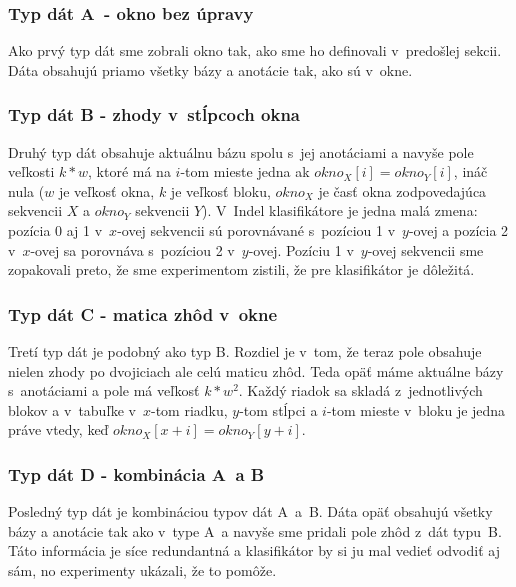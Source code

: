 \subsubsection{Typ dát A~- okno bez úpravy}

Ako prvý typ dát sme zobrali okno tak, ako sme ho definovali v~predošlej sekcii. Dáta obsahujú priamo všetky bázy a anotácie tak, ako sú v~okne.

\subsubsection{Typ dát B - zhody v~stĺpcoch okna}

Druhý typ dát obsahuje aktuálnu bázu spolu s~jej anotáciami a navyše pole veľkosti $k*w$,
ktoré má na $i$-tom mieste jedna ak $okno_X[i] = okno_Y[i]$, ináč nula
($w$ je veľkosť okna, $k$ je veľkosť bloku, $okno_X$ je časť okna zodpovedajúca sekvencii $X$ a $okno_Y$ sekvencii $Y$).
V~Indel klasifikátore je jedna malá zmena: pozícia 0 aj 1 v~$x$-ovej sekvencii sú porovnávané s~pozíciou 1 v~$y$-ovej a pozícia 2 v~$x$-ovej sa porovnáva s~pozíciou 2 v~$y$-ovej.
Pozíciu 1 v~$y$-ovej sekvencii sme zopakovali preto, že sme experimentom zistili, že pre klasifikátor je dôležitá.

\subsubsection{Typ dát C - matica zhôd v~okne}

Tretí typ dát je podobný ako typ B. Rozdiel je v~tom, že teraz pole obsahuje nielen zhody po dvojiciach ale celú maticu zhôd. Teda opäť máme aktuálne bázy s~anotáciami a pole má veľkosť $k*w^2$. Každý riadok sa skladá z~jednotlivých blokov a v~tabuľke v~$x$-tom riadku, $y$-tom stĺpci a $i$-tom mieste v~bloku je jedna práve
vtedy, keď $okno_X[x+i] = okno_Y[y+i]$.

\subsubsection{Typ dát D - kombinácia A~a B}

Posledný typ dát je kombináciou typov dát A~a~B. Dáta opäť obsahujú všetky bázy a anotácie tak ako v~type A~a navyše sme pridali pole zhôd z~dát typu~B. Táto informácia je síce redundantná a klasifikátor by si ju mal vedieť odvodiť aj sám, no experimenty ukázali, že to pomôže.

